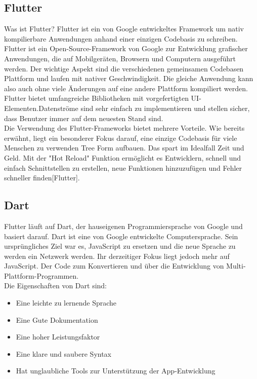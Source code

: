 \subsection{Flutter}
Was ist Flutter? Flutter ist ein von Google entwickeltes Framework um nativ kompilierbare Anwendungen anhand einer einzigen Codebasis zu schreiben.
Flutter ist ein Open-Source-Framework von Google zur Entwicklung grafischer Anwendungen, die auf Mobilgeräten, Browsern und Computern ausgeführt werden. Der wichtige Aspekt sind die verschiedenen gemeinsamen Codebasen
Plattform und laufen mit nativer Geschwindigkeit. Die gleiche Anwendung kann also auch ohne viele Änderungen auf eine andere Plattform kompiliert werden. Flutter bietet umfangreiche Bibliotheken mit vorgefertigten UI-Elementen.Datenströme sind sehr einfach zu implementieren und stellen sicher, dass Benutzer immer auf dem neuesten Stand sind.\\
Die Verwendung des Flutter-Frameworks bietet mehrere Vorteile. Wie bereits erwähnt, liegt ein besonderer Fokus darauf, eine einzige Codebasis für viele Menschen zu verwenden Tree Form aufbauen. Das spart im Idealfall Zeit und Geld. Mit der "Hot Reload" Funktion ermöglicht es Entwicklern, schnell und einfach Schnittstellen zu erstellen, neue Funktionen hinzuzufügen und  
Fehler schneller finden[Flutter].
\subsection{Dart}
Flutter läuft auf Dart, der hauseigenen Programmiersprache von Google und basiert darauf.
Dart ist eine von Google entwickelte Computersprache. Sein ursprüngliches Ziel war es, JavaScript zu ersetzen und die neue Sprache zu werden
ein Netzwerk werden. Ihr derzeitiger Fokus liegt jedoch mehr auf JavaScript.
Der Code zum Konvertieren und über die Entwicklung von Multi-Plattform-Programmen.\\
Die Eigenschaften von Dart sind:
\begin{itemize}
\item Eine leichte zu lernende Sprache
\item Eine Gute Dokumentation
\item Eine hoher Leistungsfaktor
\item Eine klare und saubere Syntax
\item Hat unglaubliche Tools zur Unterstützung der App-Entwicklung
\end{itemize}

